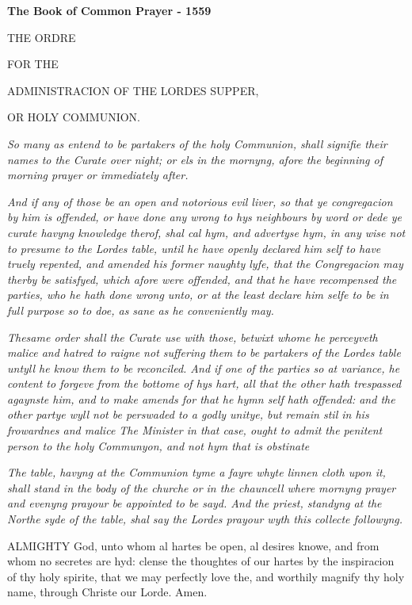 
\textbf{The Book of Common Prayer - 1559}

THE
ORDRE

FOR
THE

ADMINISTRACION
OF THE LORDES SUPPER,

OR
HOLY
COMMUNION.

\emph{So many as entend to be partakers of the holy Communion,
shall signifie their names to the Curate over night; or els in the mornyng,
afore the beginning of morning prayer or immediately after.}

\emph{And if any of those be an open and notorious evil liver, so that ye congregacion
by him is offended, or have done any wrong to hys neighbours by word or
dede ye curate havyng knowledge therof, shal cal hym, and advertyse hym,
in any wise not to presume to the Lordes table, until he have openly declared
him self to have truely repented, and amended his former naughty lyfe,
that the Congregacion may therby be satisfyed, which afore were offended,
and that he have recompensed the parties, who he hath done wrong unto,
or at the least declare him selfe to be in full purpose so to doe, as
sane as he conveniently may.}

\emph{Thesame order shall the Curate use with those, betwixt whome he perceyveth
malice and hatred to raigne not suffering them to be partakers of the
Lordes table untyll he know them to be reconciled. And if one of the parties
so at variance, he content to forgeve from the bottome of hys hart, all
that the other hath trespassed agaynste him, and to make amends for that
he hymn self hath offended: and the other partye wyll not be perswaded
to a godly unitye, but remain stil in his frowardnes and malice The Minister
in that case, ought to admit the penitent person to the holy Communyon,
and not hym that is obstinate}

\emph{The
table, havyng at the Communion tyme a fayre whyte linnen cloth upon it,
shall stand in the body of the churche or in the chauncell where mornyng
prayer and evenyng prayour be appointed to be sayd. And the priest, standyng
at the Northe syde of the table, shal say the Lordes prayour wyth this
collecte followyng.}

ALMIGHTY
God, unto whom al hartes be open, al desires knowe, and from whom no secretes
are hyd: clense the thoughtes of our hartes by the inspiracion of thy
holy spirite, that we may perfectly love the, and worthily magnify thy
holy name, through Christe our Lorde. Amen.

